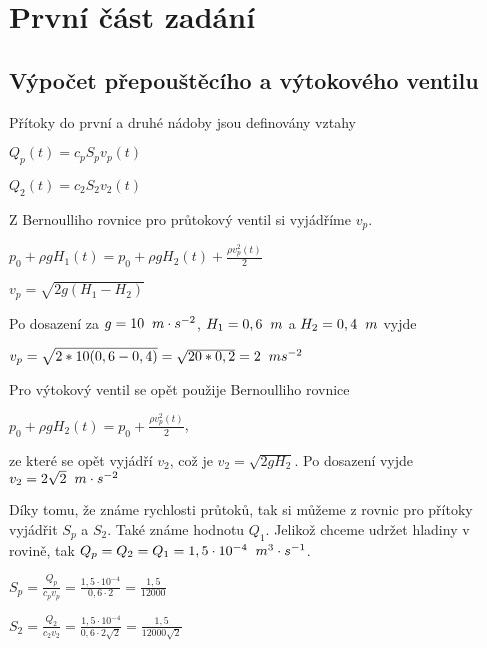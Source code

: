 \documentclass{article}
\begin{document}
	
	\newpage
	\tableofcontents %
	\newpage
		
		\newpage
	\section{První část zadání}
		\subsection{Výpočet přepouštěcího a výtokového ventilu}
			Přítoky do první a druhé nádoby jsou definovány vztahy
			\begin{center}
			$Q_p (t)=c_pS_pv_p(t)$

			\bigskip

			$Q_2(t)=c_2S_2v_2(t)$
			\end{center}

			Z Bernoulliho rovnice pro průtokový ventil si vyjádříme $v_p$.

			\begin{center}
			$p_0+\rho gH_1(t)=p_0+\rho gH_2(t)+\frac{\rho v^2_p(t)}{2}$

			$v_p=\sqrt{2g(H_1-H_2)}$

			\end{center}

			Po dosazení za $g=10 \hspace{2mm} m\cdot s^{-2}$, $H_1=0,6 \hspace{2mm} m$ a $H_2=0,4 \hspace{2mm} m$ vyjde

			\begin{center}
			$v_p=\sqrt{2*10(0,6-0,4)}=\sqrt{20*0,2}=2 \hspace{2mm} ms^{-2}$
			\end{center}
			Pro výtokový ventil se opět použije Bernoulliho rovnice
			\begin{center}
			$p_0+\rho gH_2(t)=p_0+\frac{\rho v^2_p(t)}{2}$,
			\end{center}
			 ze které se opět vyjádří $v_2$, což je $v_2=\sqrt{2gH_2}$. Po dosazení vyjde $v_2=2\sqrt{2} \hspace{2mm} m \cdot s^{-2}$

			Díky tomu, že známe rychlosti průtoků, tak si můžeme z rovnic pro přítoky vyjádřit $S_p$ a $S_2$. Také známe hodnotu $Q_1$. Jelikož chceme udržet hladiny v rovině, tak $Q_p=Q_2=Q_1=1,5 \cdot 10^{-4} \hspace{2mm} m^3 \cdot s^{-1}$.
			\begin{center}
			$S_p=\frac{Q_p}{c_pv_p}=\frac{1,5 \cdot 10^{-4}}{0,6 \cdot 2}=\frac{1,5}{12000}$

			\bigskip

			$S_2=\frac{Q_2}{c_2v_2}=\frac{1,5 \cdot 10^{-4}}{0,6 \cdot 2\sqrt{2}}=\frac{1,5}{12000\sqrt{2}}$

			\end{center}
\end{document}

